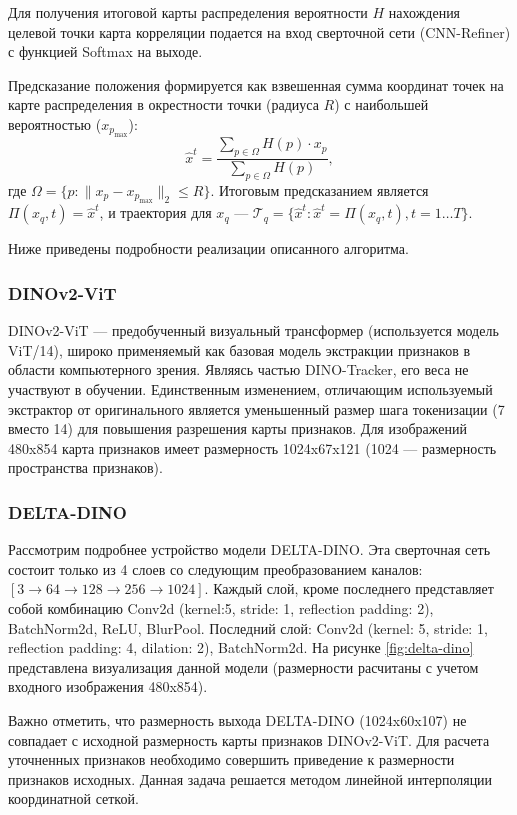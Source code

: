 \documentclass[a4paper, 14pt]{extarticle}
\theoremstyle{definition}
\theoremstyle{plain}
\theoremstyle{remark}
\begin{document}
Для получения итоговой карты распределения вероятности $H$ нахождения целевой точки карта корреляции подается на вход сверточной сети (CNN-Refiner) с функцией Softmax на выходе.

Предсказание положения формируется как взвешенная сумма координат точек на карте распределения в окрестности точки (радиуса $R$) с наибольшей вероятностью ($x_{p_{\text{max}}}$):
\begin{equation} \label{eq:prediction}
	\hat{{x}}^t = \frac{\sum_{{p} \in \Omega} {H}({p}) \cdot {x}_{{p}}}{\sum_{{p} \in \Omega} {H}({p})},
\end{equation}
где \(\Omega = \{{p} : \|{x}_{{p}} - {x}_{{p}_{\text{max}}}\|_2 \leq R\}\). Итоговым предсказанием является \(\Pi({x}_q, t) = \hat{{x}}^t\), и траектория для \({x}_q\) --- \(\mathcal{T}_q = \{\hat{{x}}^t : \hat{{x}}^t = \Pi({x}_q, t), t = 1 \dots T\}\).

Ниже приведены подробности реализации описанного алгоритма.
\subsubsection{DINOv2-ViT}
DINOv2-ViT --- предобученный визуальный трансформер (используется модель ViT/14), широко применяемый как базовая модель экстракции признаков в области компьютерного зрения.
Являясь частью DINO-Tracker, его веса не участвуют в обучении. Единственным изменением, отличающим используемый экстрактор от оригинального является уменьшенный размер шага токенизации (7 вместо 14) для повышения разрешения карты признаков.
Для изображений 480x854 карта признаков имеет размерность 1024x67x121 (1024 --- размерность пространства признаков).
\subsubsection{DELTA-DINO}
Рассмотрим подробнее устройство модели DELTA-DINO. 
Эта сверточная сеть состоит только из 4 слоев со следующим преобразованием каналов: $[3 \to 64 \to 128 \to 256 \to 1024]$. 
Каждый слой, кроме последнего представляет собой комбинацию Conv2d (kernel:5, stride: 1, reflection padding: 2), BatchNorm2d, ReLU, BlurPool. 
Последний слой: Conv2d (kernel: 5, stride: 1, reflection padding: 4, dilation: 2), BatchNorm2d. 
На рисунке \ref{fig:delta-dino} представлена визуализация данной модели (размерности расчитаны с учетом входного изображения 480x854).

Важно отметить, что размерность выхода DELTA-DINO (1024x60x107) не совпадает с исходной размерность карты признаков DINOv2-ViT. Для расчета уточненных признаков необходимо совершить приведение к размерности признаков исходных. Данная задача решается методом линейной интерполяции координатной сеткой.
\end{document}
